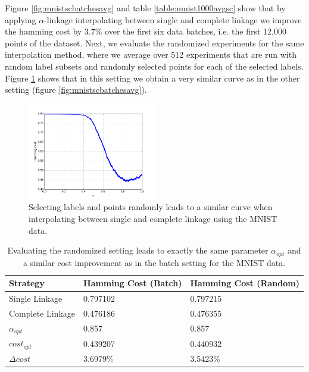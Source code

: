 Figure \ref{fig:mnistscbatchesavg} and table \ref{table:mnist1000avgsc} show that by applying $\alpha$-linkage interpolating between single and complete linkage we improve the hamming cost by $3.7\%$ over the first six data batches, i.e. the first 12,000 points of the dataset. Next, we evaluate the randomized experiments for the same interpolation method, where we average over 512 experiments that are run with random label subsets and randomly selected points for each of the selected labels. Figure \ref{fig:mnistscrandom} shows that in this setting we obtain a very similar curve as in the other setting (figure \ref{fig:mnistscbatchesavg}).

\begin{figure}[H]
    \centering
    \includegraphics[width=0.5\textwidth]{plots/mnist-sc-random.png}
    \caption{Selecting labels and points randomly leads to a similar curve when interpolating between single and complete linkage using the MNIST data.}
    \label{fig:mnistscrandom}
\end{figure}

\begin{table}[H]
    \centering
    \begin{tabular}{|l | l | l |}
    \hline
    Strategy & Hamming Cost (Batch) & Hamming Cost (Random)\\ \hline
    Single Linkage & 0.797102 & 0.797215\\
    Complete Linkage & 0.476186 & 0.476355\\
    $\alpha_{opt}$ & 0.857 & 0.857\\
    $cost_{opt}$ & 0.439207 & 0.440932\\
    $\Delta cost$ & 3.6979\% & 3.5423\%\\\hline
    \end{tabular}
    \caption{Evaluating the randomized setting leads to exactly the same parameter $\alpha_{opt}$ and a similar cost improvement as in the batch setting for the MNIST data.}
    \label{table:mnist1000randomsc}
\end{table}

